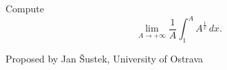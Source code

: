 Compute
$$ \lim_{A\to+\infty}\frac1A\int_1^A
A^{\frac1x}\, dx . $$

Proposed by Jan Šustek, University of Ostrava